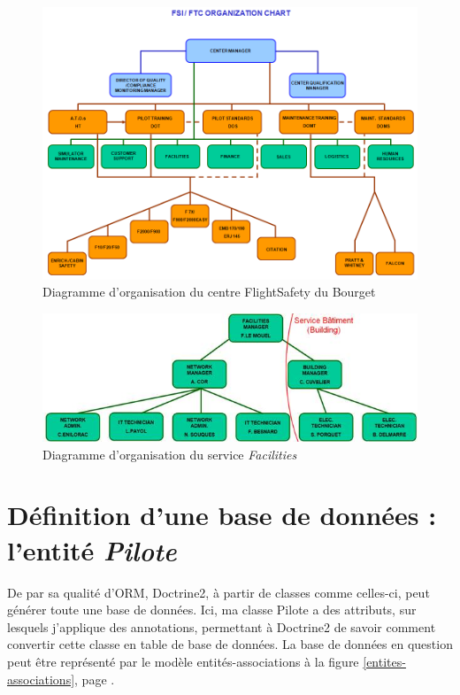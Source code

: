 \documentclass[a4paper,french,11pt,openany,oneside]{memoir}
\begin{document}
\begin{center}
\begin{figure}[ht]
\centering
     \includegraphics[width=1.0\textwidth]{img/FSIFTC}
      \caption{Diagramme d'organisation du centre FlightSafety du Bourget}
      \label{figure-fsi-ftc}
\end{figure}
\end{center}

\begin{center}
\begin{figure}[ht]
\centering
     \includegraphics[width=1.0\textwidth]{img/Facilities}
      \caption{Diagramme d'organisation du service \emph{Facilities}}
      \label{figure-facilities}
\end{figure}
\end{center}


\chapter{Définition d'une base de données : l'entité \emph{Pilote}}
\label{entite-pilote}

De par sa qualité d'ORM, Doctrine2, à partir de classes comme celles-ci, peut générer toute une base de données. Ici, ma classe Pilote a des attributs, sur lesquels j'applique des annotations, permettant à Doctrine2 de savoir comment convertir cette classe en table de base de données. La base de données en question peut être représenté par le modèle entités-associations à la figure \ref{entites-associations}, page \pageref{entites-associations}.
\end{document}
